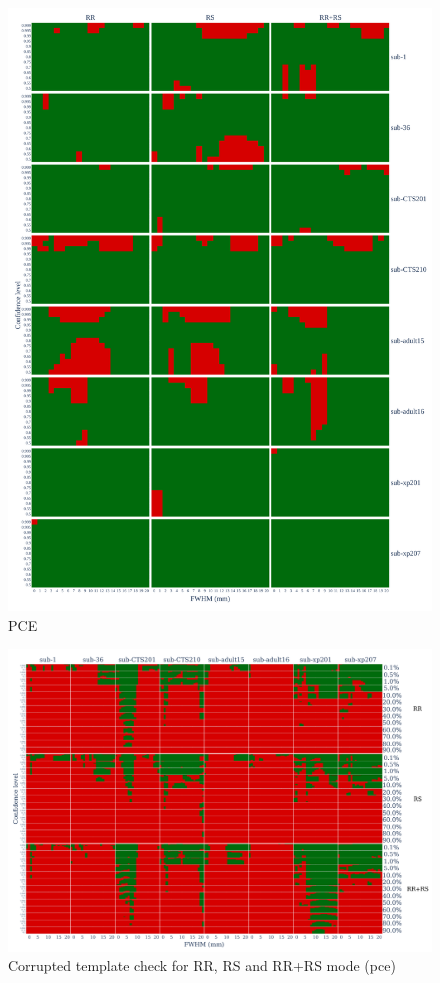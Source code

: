 \documentclass{article}
\begin{document}
\begin{appendices}
    \begin{figure}
        \centering
        \includegraphics[width=\linewidth]{figures/exclude_pce.pdf}
        \caption{PCE}
        \label{fig:loo_pce}
    \end{figure}

    \begin{figure}
        \centering
        \includegraphics[width=\linewidth]{figures/template/one_pce__template_annotated.pdf}
        \caption{Corrupted template check for RR, RS and RR+RS mode (pce)}
    \end{figure}

\end{appendices}




\end{document}
